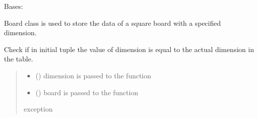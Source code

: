 \documentclass[letterpaper,10pt,english]{sphinxmanual}
\begin{document}
\begin{fulllineitems}
\label{\detokenize{board:board.Board}}
\pysigstartsignatures
{}
\pysigstopsignatures
\sphinxAtStartPar
Bases: 

\sphinxAtStartPar
Board class is used to store the data of
a square board with a specified dimension.

\begin{fulllineitems}
\label{\detokenize{board:board.Board.checkDimNBoardRelation}}
\pysigstartsignatures
{}
\pysigstopsignatures
\sphinxAtStartPar
Check if in initial tuple the value of dimension
is equal to the actual dimension in the table.
\begin{quote}\begin{description}
\begin{itemize}
\item {} 
\sphinxAtStartPar
{} () \textendash{} dimension is passed to the function

\item {} 
\sphinxAtStartPar
{} () \textendash{} board is passed to the function

\end{itemize}

\sphinxAtStartPar
{} \textendash{} exception

\end{description}\end{quote}

\end{fulllineitems}



\end{fulllineitems}
\end{document}
